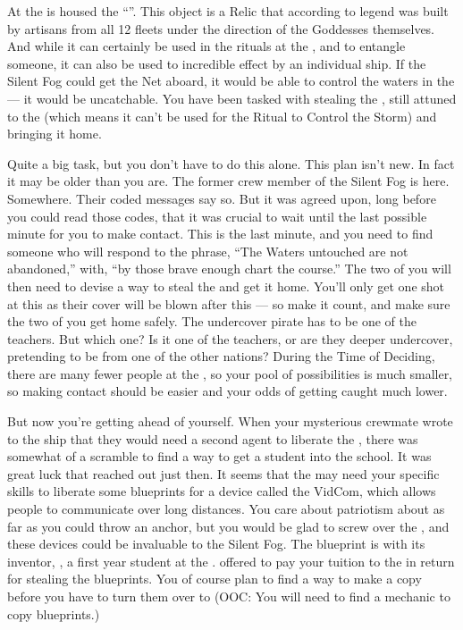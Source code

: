 \documentclass[char]{GL2020}
\begin{document}
At the \pSchool{} is housed the ``\iNet{}''. This object is a Relic that according to legend was built by artisans from all 12 fleets under the direction of the Goddesses themselves. And while it can certainly be used in the rituals at the \pSc{}, and to entangle someone, it can also be used to incredible effect by an individual ship. If the Silent Fog could get the Net aboard, it would be able to control the waters in the \pWod{} — it would be uncatchable. You have been tasked with stealing the \iNet{}, still attuned to the \pShip{} (which means it can’t be used for the Ritual to Control the Storm) and bringing it home.

Quite a big task, but you don't have to do this alone. This plan isn’t new. In fact it may be older than you are. The former crew member of the Silent Fog is here. Somewhere. Their coded messages say so. But it was agreed upon, long before you could read those codes, that it was crucial to wait until the last possible minute for you to make contact. This is the last minute, and you need to find someone who will respond to the phrase, ``The Waters untouched are not abandoned,'' with, ``by those brave enough chart the course.'' The two of you will then need to devise a way to steal the \iNet{} and get it home. You'll only get one shot at this as their cover will be blown after this — so make it count, and make sure the two of you get home safely. The undercover pirate has to be one of the teachers. But which one? Is it one of the \pShip{} teachers, or are they deeper undercover, pretending to be from one of the other nations? During the Time of Deciding, there are many fewer people at the \pSc{}, so your pool of possibilities is much smaller, so making contact should be easier and your odds of getting caught much lower.

But now you're getting ahead of yourself. When your mysterious crewmate wrote to the ship that they would need a second agent to liberate the \iNet{}, there was somewhat of a scramble to find a way to get a student into the school. It was great luck that \cChupLeader{} reached out just then. It seems that the \pShip{} may need your specific skills to liberate some blueprints for a device called the VidCom, which allows people to communicate over long distances. You care about patriotism about as far as you could throw an anchor, but you would be glad to screw over the \pTech{}, and these devices could be invaluable to the Silent Fog. The blueprint is with its inventor, \cTechStar{\intro}, a first year student at the \pSchool{}. \cChupLeader{} offered to pay your tuition to the \pSc{} in return for stealing the blueprints. You of course plan to find a way to make a copy before you have to turn them over to \cChupLeader{} (OOC: You will need to find a mechanic to copy blueprints.)
\end{document}
